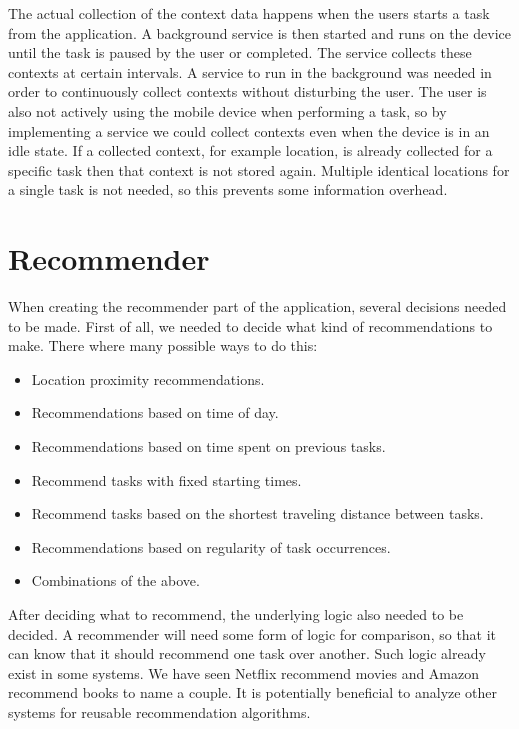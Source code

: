 The actual collection of the context data happens when the users starts a task from the application. A background service is then started and runs on the device until the task is paused by the user or completed. The service collects these contexts at certain intervals. A service to run in the background was needed in order to continuously collect contexts without disturbing the user. The user is also not actively using the mobile device when performing a task, so by implementing a service we could collect contexts even when the device is in an idle state. If a collected context, for example location, is already collected for a specific task then that context is not stored again. Multiple identical locations for a single task is not needed, so this prevents some information overhead.



\section{Recommender}
\label{sec:recommender}

When creating the recommender part of the application, several decisions needed to be made. First of all, we needed to decide what kind of recommendations to make. There where many possible ways to do this:
\begin{itemize}
	\item Location proximity recommendations.
  \item Recommendations based on time of day.
  \item Recommendations based on time spent on previous tasks.
  \item Recommend tasks with fixed starting times.
  \item Recommend tasks based on the shortest traveling distance between tasks.
  \item Recommendations based on regularity of task occurrences.
  \item Combinations of the above.
\end{itemize}

After deciding what to recommend, the underlying logic also needed to be decided. A recommender will need some form of logic for comparison, so that it can know that it should recommend one task over another. Such logic already exist in some systems. We have seen Netflix\cite{netflix} recommend movies and Amazon\cite{amazon} recommend books to name a couple. It is potentially beneficial to analyze other systems for reusable recommendation algorithms.


